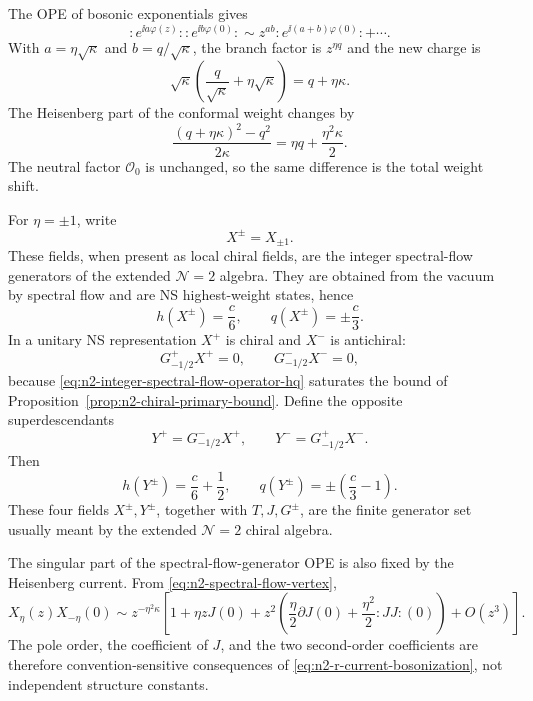 The OPE of bosonic exponentials gives
\[
  :e^{\ii a\varphi(z)}:
  :e^{\ii b\varphi(0)}:
  \sim
  z^{ab}:e^{\ii(a+b)\varphi(0)}:+\cdots .
\]
With \(a=\eta\sqrt\kappa\) and \(b=q/\sqrt\kappa\), the branch factor is
\(z^{\eta q}\) and the new charge is
\[
  \sqrt\kappa\left(\frac q{\sqrt\kappa}+\eta\sqrt\kappa\right)
  =
  q+\eta\kappa .
\]
The Heisenberg part of the conformal weight changes by
\[
  \frac{(q+\eta\kappa)^2-q^2}{2\kappa}
  =
  \eta q+\frac{\eta^2\kappa}{2}.
\]
The neutral factor \(\mathcal O_0\) is unchanged, so the same difference is
the total weight shift.

For \(\eta=\pm1\), write
\[
  X^\pm=X_{\pm1}.
\]
These fields, when present as local chiral fields, are the integer
spectral-flow generators of the extended \(\mathcal N=2\) algebra.  They
are obtained from the vacuum by spectral flow and are NS highest-weight
states, hence
\begin{equation}
  h(X^\pm)=\frac c6,
  \qquad
  q(X^\pm)=\pm\frac c3 .
  \label{eq:n2-integer-spectral-flow-operator-hq}
\end{equation}
In a unitary NS representation \(X^+\) is chiral and \(X^-\) is antichiral:
\begin{equation}
  G^+_{-1/2}X^+=0,
  \qquad
  G^-_{-1/2}X^-=0,
  \label{eq:n2-spectral-flow-operator-shortening}
\end{equation}
because \eqref{eq:n2-integer-spectral-flow-operator-hq} saturates the
bound of Proposition~\ref{prop:n2-chiral-primary-bound}.  Define the
opposite superdescendants
\begin{equation}
  Y^+=G^-_{-1/2}X^+,
  \qquad
  Y^-=G^+_{-1/2}X^- .
  \label{eq:n2-extended-y-operators}
\end{equation}
Then
\begin{equation}
  h(Y^\pm)=\frac c6+\frac12,
  \qquad
  q(Y^\pm)=\pm\left(\frac c3-1\right).
  \label{eq:n2-extended-y-operator-hq}
\end{equation}
These four fields \(X^\pm,Y^\pm\), together with
\(T,J,G^\pm\), are the finite generator set usually meant by the extended
\(\mathcal N=2\) chiral algebra.

The singular part of the spectral-flow-generator OPE is also fixed by the
Heisenberg current.  From \eqref{eq:n2-spectral-flow-vertex},
\begin{equation}
  X_\eta(z)X_{-\eta}(0)
  \sim
  z^{-\eta^2\kappa}
  \left[
    1+\eta zJ(0)
    +z^2\left(
      \frac{\eta}{2}\partial J(0)
      +\frac{\eta^2}{2}:J J:(0)
    \right)
    +O(z^3)
  \right].
  \label{eq:n2-spectral-flow-opposite-ope}
\end{equation}
The pole order, the coefficient of \(J\), and the two second-order
coefficients are therefore convention-sensitive consequences of
\eqref{eq:n2-r-current-bosonization}, not independent structure constants.

